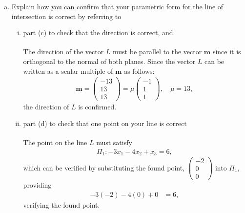 \documentclass{amsart}
\renewcommand{\vec}{\mathbf}
\newcommand{\cvec}[1]{ \begin{pmatrix} #1 \end{pmatrix} }
\begin{document}
\begin{enumerate}[(a)]
			\item Explain how you can confirm that your parametric form for the line of intersection is correct by referring to
				\begin{enumerate}[(i)]
					\item part (c) to check that the direction is correct, and
						\\ \\
						The direction of the vector $L$ must be parallel to the vector $\vec{m}$ since it is orthogonal to the normal of both planes. Since the vector $L$ can be written as a scalar multiple of $\vec{m}$ as follows:
							\begin{alignat*}
								\vec{m} = \cvec{-13\\13\\13} = \mu \cvec{-1\\1\\1}, \quad \mu = 13,
							\end{alignat*}
						the direction of $L$ is confirmed.
						\\

					\item part (d) to check that one point on your line is correct
						\\ \\
						The point on the line $L$ must satisfy
							\begin{align*}
								\Pi_1: -3x_1 - 4x_2 + x_3 = 6,
							\end{align*}
						which can be verified by substituting the found point, $\cvec{-2\\0\\0}$ into $\Pi_1$, providing
							\begin{align*}
								-3(-2) - 4(0) + 0 &= 6,
							\end{align*}
						verifying the found point.
						\\
				\end{enumerate}
		\end{enumerate}

\newpage
\end{document}
